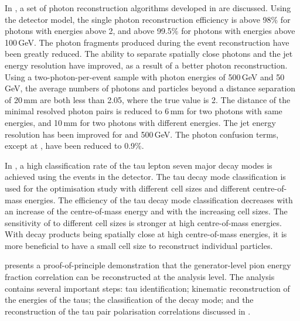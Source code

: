  In , a set of photon reconstruction algorithms developed in \pandora are discussed. Using the \ILD detector model, the single photon reconstruction efficiency is above 98\% for photons with energies above 2\GeV, and above 99.5\% for photons with energies above 100\,GeV. The photon fragments produced during the event reconstruction have been greatly reduced. The ability to separate spatially close photons and the jet energy resolution have improved, as a result of a better photon reconstruction. Using a two-photon-per-event sample with photon energies of  500\,GeV and 50\,GeV, the average numbers of photons and particles beyond a distance separation of 20\,mm  are both less than 2.05, where the true value is 2. The distance of the minimal resolved photon pairs is reduced to 6\,mm for two photons with same energies, and 10\,mm for two photons with different energies. The jet energy resolution has been improved for  and 500\,GeV. The photon confusion terms, except at , have been reduced to 0.9\%.



In , a high classification rate of the tau lepton seven major decay modes is achieved using the \eeTauTau events in the \ILD detector. The tau decay mode classification is used for the \ECAL optimisation study with different \ECAL cell sizes and different centre-of-mass energies. The efficiency of the tau decay mode classification  decreases with an increase of the centre-of-mass energy and with the  increasing \ECAL cell sizes. The sensitivity of \tauHad to different cell sizes is stronger at high centre-of-mass energies.  With decay products being spatially close at high centre-of-mass energies, it is more beneficial to have a small \ECAL cell size to reconstruct individual particles.

 presents a proof-of-principle demonstration that the generator-level pion energy fraction correlation can be reconstructed at the analysis level. The analysis contains several important steps: tau identification; kinematic reconstruction of the energies of the taus; the classification of the  \tauToPionBoth decay mode; and the reconstruction of the tau pair polarisation correlations discussed in .


